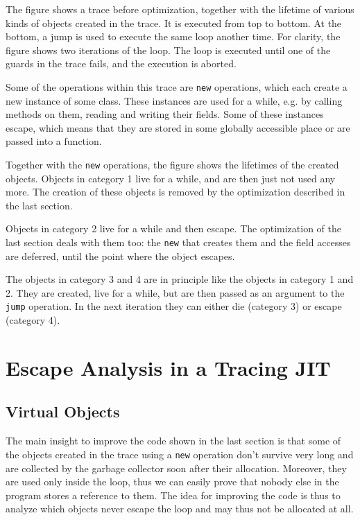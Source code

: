 \documentclass{sigplanconf}
\begin{document}
The figure shows a trace before optimization, together with the lifetime of
various kinds of objects created in the trace. It is executed from top to
bottom. At the bottom, a jump is used to execute the same loop another time.
For clarity, the figure shows two iterations of the loop.
The loop is executed until one of the guards in the trace fails, and the
execution is aborted.

Some of the operations within this trace are \texttt{new} operations, which each create a
new instance of some class. These instances are used for a while, e.g. by
calling methods on them, reading and writing their fields. Some of these
instances escape, which means that they are stored in some globally accessible
place or are passed into a function.

Together with the \texttt{new} operations, the figure shows the lifetimes of the
created objects. Objects in category 1 live for a while, and are then just not
used any more. The creation of these objects is removed by the
optimization described in the last section.

Objects in category 2 live for a while and then escape. The optimization of the
last section deals with them too: the \texttt{new} that creates them and
the field accesses are deferred, until the point where the object escapes.

The objects in category 3 and 4 are in principle like the objects in category 1
and 2. They are created, live for a while, but are then passed as an argument
to the \texttt{jump} operation. In the next iteration they can either die (category
3) or escape (category 4).

\section{Escape Analysis in a Tracing JIT}
\label{sec:virtuals}


\subsection{Virtual Objects}

The main insight to improve the code shown in the last section is that some of
the objects created in the trace using a \texttt{new} operation don't survive very
long and are collected by the garbage collector soon after their allocation.
Moreover, they are used only inside the loop, thus we can easily prove that
nobody else in the program stores a reference to them. The
idea for improving the code is thus to analyze which objects never escape the
loop and may thus not be allocated at all.
\end{document}
